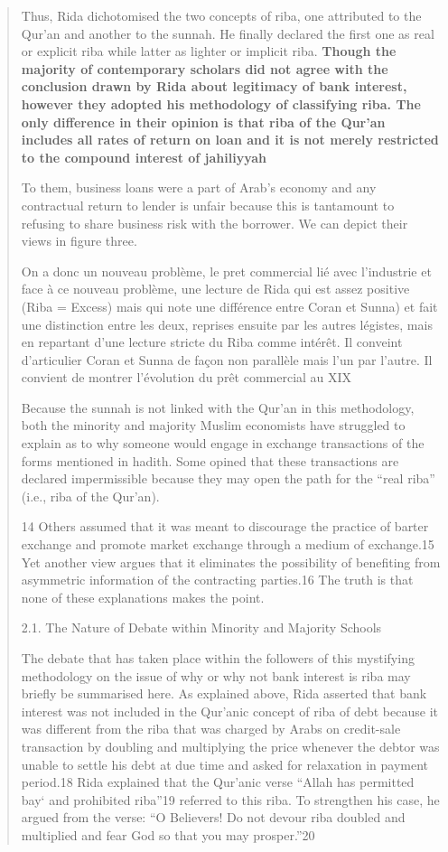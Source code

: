 \begin{quote}
Thus, Rida dichotomised the two concepts of riba, one attributed to the Qur'an and another to the sunnah. He finally declared the first one as real or explicit riba while latter as lighter or implicit riba.
\textbf{
Though the majority of contemporary scholars did not agree with the conclusion drawn by Rida about legitimacy of bank interest, however they adopted his methodology of classifying riba. The only difference in their opinion is that riba of the Qur'an includes all rates of return on loan and it is not merely restricted to the compound interest of jahiliyyah}


To them, business loans were a part of Arab's economy and any contractual return to lender is unfair because this is tantamount to refusing to share business risk with the borrower. We can depict their views in figure three.
\begin{Synthesis}
On a donc un nouveau problème, le pret commercial lié avec l'industrie et face à ce nouveau problème, une lecture de Rida qui est assez positive (Riba = Excess) mais qui note une différence entre Coran et Sunna) et fait une distinction entre les deux, reprises ensuite par les autres légistes, mais en repartant d'une lecture stricte du Riba comme intérêt. Il conveint d'articulier Coran et Sunna de façon non parallèle mais l'un par l'autre.
Il convient de montrer l'évolution du prêt commercial au XIX
\end{Synthesis}
Because the sunnah is not linked with the Qur'an in this methodology, both the minority and majority Muslim economists have struggled to explain as to why someone would engage in exchange transactions of the forms mentioned in hadith. Some opined that these transactions are declared impermissible because they may open the path for the “real riba” (i.e., riba of the Qur'an).


14 Others assumed that it was meant to discourage the practice of barter exchange and promote market exchange through a medium of exchange.15 Yet another view argues that it eliminates the possibility of benefiting from asymmetric information of the contracting parties.16 The truth is that none of these explanations makes the point.

2.1. The Nature of Debate within Minority and Majority Schools

The debate that has taken place within the followers of this mystifying methodology on the issue of why or why not bank interest is riba may briefly be summarised here. As explained above, Rida asserted that bank interest was not included in the Qur'anic concept of riba of debt because it was different from the riba that was charged by Arabs on credit-sale transaction by doubling and multiplying the price whenever the debtor was unable to settle his debt at due time and asked for relaxation in payment period.18 Rida explained that the Qur'anic verse “Allah has permitted bay‘ and prohibited riba”19 referred to this riba. To strengthen his case, he argued from the verse: “O Believers! Do not devour riba doubled and multiplied and fear God so that you may prosper.”20


\end{quote}
